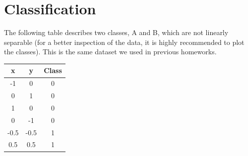 \documentclass{article}
\begin{document}
\section{Classification}
The following table describes two classes, A and B, which are not linearly separable (for a better inspection of the data, it is highly recommended to plot the classes). This is the same dataset we used in previous homeworks.

\begin{table}
    \centering
    \begin{tabular}{c|c|c}
        x&y&Class\\
        \hline
        -1& 0& 0\\
        0& 1& 0\\
        1& 0& 0\\
        0& -1& 0\\
        -0.5& -0.5& 1\\
        0.5& 0.5& 1\\
    \end{tabular}
\end{table}
\end{document}

